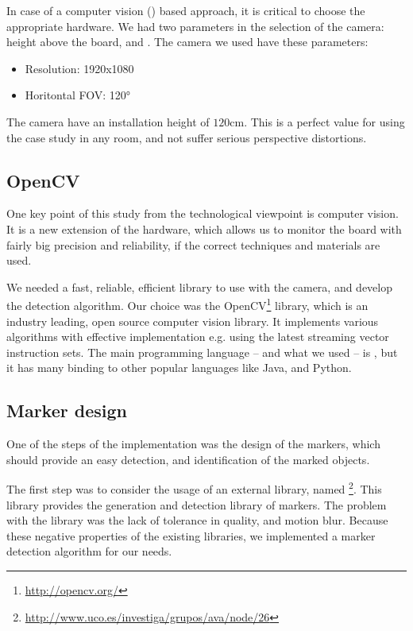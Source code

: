 In case of a computer vision () based approach, it is critical to choose the appropriate hardware. We had two parameters in the selection of the camera: height above the board, and . The camera we used have these parameters:
\begin{itemize}
	\item Resolution: 1920x1080
	\item Horitontal FOV: \ang{120}
\end{itemize}

The camera have an installation height of $120$\si{\centi\meter}. This is a perfect value for using the case study in any room, and not suffer serious perspective distortions.

\subsection{OpenCV}

One key point of this study from the technological viewpoint is computer vision. It is a new extension of the hardware, which allows us to monitor the board with fairly big precision and reliability, if the correct techniques and materials are used.

We needed a fast, reliable, efficient library to use with the camera, and develop the detection algorithm. Our choice was the OpenCV\footnote{\url{http://opencv.org/}} library, which is an industry leading, open source computer vision library. It implements various algorithms with effective implementation e.g. using the latest streaming vector instruction sets. The main programming language -- and what we used -- is , but it has many binding to other popular languages like Java, and Python.

\subsection{Marker design}

One of the steps of the  implementation was the design of the markers, which should provide an easy detection, and identification of the marked objects.

The first step was to consider the usage of an external library, named \footnote{\url{http://www.uco.es/investiga/grupos/ava/node/26}}. This library provides the generation and detection library of markers. The problem with the library was the lack of tolerance in quality, and motion blur. Because these negative properties of the existing libraries, we implemented a marker detection algorithm for our needs.

